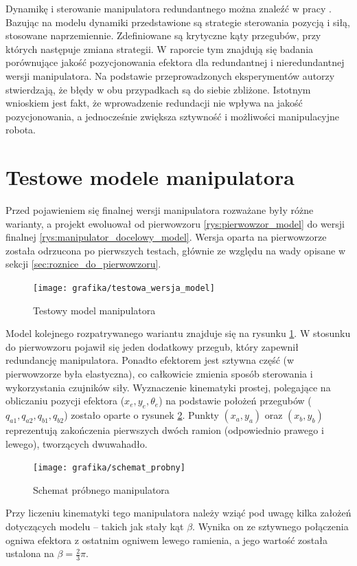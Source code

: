 \documentclass[printmode]{mgr}
\begin{document}
Dynamikę i sterowanie manipulatora redundantnego można znaleźć w pracy \cite{inne4}. Bazując na modelu dynamiki przedstawione
są strategie sterowania pozycją i siłą, stosowane naprzemiennie. Zdefiniowane są krytyczne kąty przegubów, przy których następuje zmiana
strategii. W raporcie tym znajdują się badania porównujące jakość pozycjonowania efektora dla redundantnej i nieredundantnej wersji manipulatora.
Na podstawie przeprowadzonych eksperymentów autorzy stwierdzają, że błędy w obu przypadkach są do siebie zbliżone. Istotnym wnioskiem jest
fakt, że wprowadzenie redundacji nie wpływa na jakość pozycjonowania, a jednocześnie zwiększa sztywność i możliwości manipulacyjne robota.

\section{Testowe modele manipulatora}
Przed pojawieniem się finalnej wersji manipulatora rozważane były różne warianty, a projekt ewoluował od pierwowzoru \ref{rys:pierwowzor_model}
do wersji finalnej \ref{rys:manipulator_docelowy_model}. Wersja oparta na pierwowzorze została odrzucona po pierwszych
testach, głównie ze względu na wady opisane w sekcji \ref{sec:roznice_do_pierwowzoru}. 
\begin{figure}[tp]
\centering
  \texttt{[image: grafika/testowa\_wersja\_model]}
  \caption{Testowy model manipulatora}
  \label{rys:testowa_wersja_model}  
\end{figure}

Model kolejnego rozpatrywanego wariantu znajduje się na rysunku \ref{rys:testowa_wersja_model}. W stosunku do pierwowzoru pojawił
się jeden dodatkowy przegub, który zapewnił redundancję manipulatora. Ponadto efektorem jest sztywna część (w pierwowzorze była elastyczna),
co całkowicie zmienia sposób sterowania i wykorzystania czujników siły. 
Wyznaczenie kinematyki prostej, polegające
na obliczaniu pozycji efektora ($x_e, y_e, \theta_e$) na podstawie położeń przegubów ($q_{a1}, q_{a2}, q_{b1}, q_{b2}$)
zostało oparte o rysunek \ref{rys:schemat_probny}. Punkty $(x_a, y_a)$ oraz $(x_b, y_b)$ reprezentują zakończenia pierwszych
dwóch ramion (odpowiednio prawego i lewego), tworzących dwuwahadło.
\begin{figure}[tp]
\centering
  \texttt{[image: grafika/schemat\_probny]}
  \caption{Schemat próbnego manipulatora}
  \label{rys:schemat_probny}  
\end{figure}

Przy liczeniu kinematyki tego manipulatora należy wziąć pod uwagę kilka założeń dotyczących modelu -- takich jak stały kąt $\beta$.
Wynika on ze sztywnego połączenia ogniwa efektora z ostatnim ogniwem lewego ramienia, a jego wartość została ustalona na $\beta = \frac{2}{3}\pi$.
\end{document}
